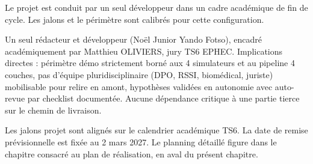 Le projet est conduit par un seul développeur dans un cadre académique de fin de cycle. Les jalons et le périmètre sont calibrés pour cette configuration.

\begin{bridgenote}
Un seul rédacteur et développeur (Noël Junior Yando Fotso), encadré académiquement par Matthieu OLIVIERS, jury TS6 EPHEC. Implications directes : périmètre démo strictement borné aux 4 simulateurs et au pipeline 4 couches, pas d'équipe pluridisciplinaire (DPO, RSSI, biomédical, juriste) mobilisable pour relire en amont, hypothèses validées en autonomie avec auto-revue par checklist documentée. Aucune dépendance critique à une partie tierce sur le chemin de livraison.
\end{bridgenote}

Les jalons projet sont alignés sur le calendrier académique TS6. La date de remise prévisionnelle est fixée au 2 mars 2027. Le planning détaillé figure dans le chapitre consacré au plan de réalisation, en aval du présent chapitre.
